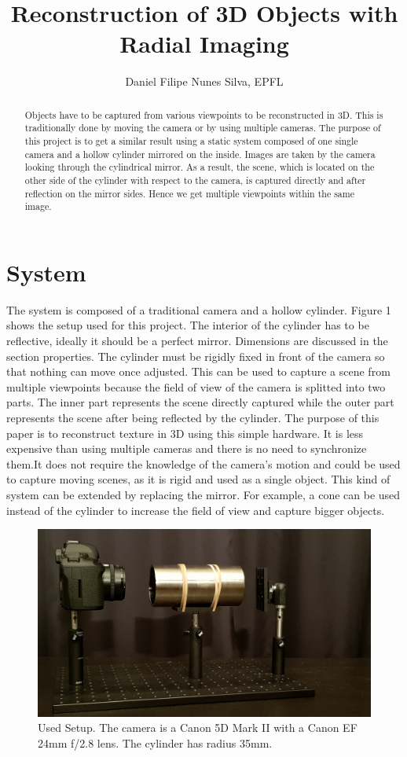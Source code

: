\documentclass[a4paper,twocolumn,fleqn]{article}
\title{Reconstruction of 3D Objects with Radial Imaging}
\author{Daniel Filipe Nunes Silva, EPFL}
\begin{document}
\maketitle
\thispagestyle{empty}

\begin{abstract}
Objects have to be captured from various viewpoints to be reconstructed in 3D. This is traditionally done by moving the camera or by using multiple cameras. The purpose of this project is to get a similar result using a static system composed of one single camera and a hollow cylinder mirrored on the inside. Images are taken by the camera looking through the cylindrical mirror. As a result, the scene, which is located on the other side of the cylinder with respect to the camera, is captured directly and after reflection on the mirror sides. Hence we get multiple viewpoints within the same image.
\end{abstract}

\section{System}
The system is composed of a traditional camera and a hollow cylinder. Figure 1 shows the setup used for this project. The interior of the cylinder has to be reflective, ideally it should be a perfect mirror. Dimensions are discussed in the section properties. The cylinder must be rigidly fixed in front of the camera so that nothing can move once adjusted. This can be used to capture a scene from multiple viewpoints because the field of view of the camera is splitted into two parts. The inner part represents the scene directly captured while the outer part represents the scene after being reflected by the cylinder. The purpose of this paper is to reconstruct texture in 3D using this simple hardware. It is less expensive than using multiple cameras and there is no need to synchronize them.It does not require the knowledge of the camera's motion and could be used to capture moving scenes, as it is rigid and used as a single object. This kind of system can be extended by replacing the mirror. For example, a cone can be used instead of the cylinder to increase the field of view and capture bigger objects.

\begin{figure}[!hb]
  \centering
  \includegraphics[width=1\columnwidth]{img/setup.jpg}
  \caption{Used Setup. The camera is a Canon 5D Mark II with a Canon EF 24mm f/2.8 lens. The cylinder has radius 35mm.}
\end{figure}
\end{document}
